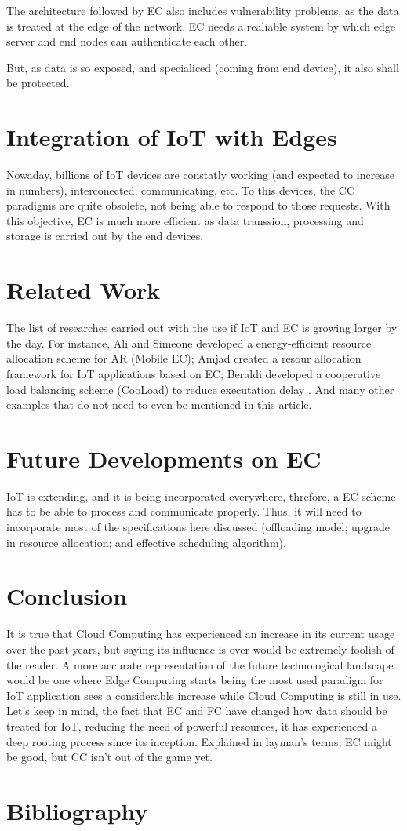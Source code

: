 \documentclass[10pt]{article}
\begin{document}
The architecture followed by EC also includes vulnerability problems, as the
data is treated at the edge of the network. EC needs a realiable system by which
edge server and end nodes can authenticate each other.

But, as data is so exposed, and specialiced (coming from end device), it also
shall be protected.

\section{Integration of IoT with Edges}

Nowaday, billions of IoT devices are constatly working (and expected to increase
in numbers), interconected, communicating, etc. To this devices, the CC
paradigms are quite obsolete, not being able to respond to those requests. With
this objective, EC is much more efficient as data transsion, processing and
storage is carried out by the end devices.

\section{Related Work}

The list of researches carried out with the use if IoT and EC is growing larger
by the day. For instance, Ali and Simeone developed a energy-efficient resource
allocation scheme for AR (Mobile EC); Amjad created a resour allocation
framework for IoT applications based on EC; Beraldi developed a cooperative load
balancing scheme (CooLoad) to reduce executation delay \cite{artiot}. And many 
other examples that do not need to even be mentioned in this article.

\section{Future Developments on EC}

IoT is extending, and it is being incorporated everywhere, threfore, a EC scheme
has to be able to process and communicate properly. Thus, it will need to
incorporate most of the specifications here discussed (offloading model; upgrade
in resource allocation; and effective scheduling algorithm).

\section{Conclusion}

It is true that Cloud Computing has experienced an increase in its current usage
over the past years, but saying its influence is over would be extremely foolish
of the reader. A more accurate representation of the future technological 
landscape would be one where Edge Computing starts being the most used paradigm 
for IoT application sees a considerable increase while Cloud Computing is still 
in use. Let's keep in mind, the fact that EC and FC have changed how data should
be treated for IoT, reducing the need of  powerful resources, it has experienced 
a deep rooting process since its inception. Explained in layman's terms, EC 
might be good, but CC isn't out of the game yet.


\section*{Bibliography}
\printbibliography
\end{document}
